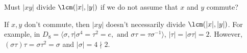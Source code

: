 \begin{question}
   Must $\lvert xy\rvert$ divide $\lcm(\lvert x\rvert,\vert y\rvert)$ if we do not assume that $x$ and $y$ commute?
\end{question}

\begin{answer}
    If $x, y$ don't commute, then $\lvert xy \rvert$ doesn't necessarily divide $\lcm(\lvert x \rvert, \lvert y \rvert)$. For example, in $D_{8} = \langle \sigma, \tau \lvert \sigma^4 = \tau^2 = e, \text{ and } \sigma\tau = \tau\sigma^{-1}\rangle$, $\lvert \tau \rvert = \lvert \sigma\tau \rvert = 2$. However, $(\sigma\tau)\tau = \sigma\tau^2 = \sigma$ and $\lvert \sigma \rvert = 4 \nmid 2$.
\end{answer}
